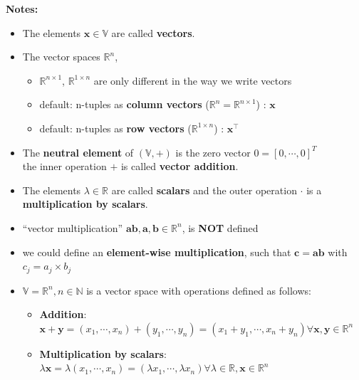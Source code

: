 \textbf{Notes:}
\begin{itemize}
    \item The elements $\mathbf{x}\in\mathbb{V}$ are called \textbf{vectors}.
        \item The vector spaces $\mathbb{R}^n$, 
        \begin{itemize}
            \item $\mathbb{R}^{n\times 1}$, $\mathbb{R}^{1\times n}$ are only different in the way we write vectors
        
            \item default: n-tuples as \textbf{column vectors} ($\mathbb{R}^n = \mathbb{R}^{n \times 1}$) : $\mathbf{x}$
    
            \item default: n-tuples as \textbf{row vectors} ($\mathbb{R}^{1 \times n}$) : $\mathbf{x}^\top$
        \end{itemize}

    \item The \textbf{neutral element} of $(\mathbb{V}, +)$ is the zero vector $0 = [0, \cdots, 0]^T$ \\
    the inner operation $+$ is called \textbf{vector addition}.

    \item The elements $\lambda\in\mathbb{R}$ are called \textbf{scalars} and the outer operation $\cdot$ is a \textbf{multiplication by scalars}.

    \item “vector multiplication” $\mathbf{ab, a, b} \in \mathbb{R}^n$, is \textbf{NOT} defined

    \item we could define an \textbf{element-wise multiplication}, such that $\mathbf{c = ab}$ with $c_j = a_j \times b_j$

    \item $\mathbb{V} = \mathbb{R}^n, n \in \mathbb{N}$ is a vector space with operations defined as follows:
    \begin{itemize}
        \item \textbf{Addition}:\\ $\mathbf{x+y} = (x_1, \cdots, x_n)+(y_1, \cdots, y_n) = (x_1+y_1, \cdots, x_n+y_n) \forall \mathbf{x, y} \in \mathbb{R}^n$

        \item \textbf{Multiplication by scalars}:\\ $\lambda\mathbf{x} = \lambda(x_1, \cdots, x_n) = (\lambda x_1, \cdots, \lambda x_n) \forall \lambda \in \mathbb{R}, \mathbf{x} \in \mathbb{R}^n$
        

\end{itemize}
\end{itemize}
